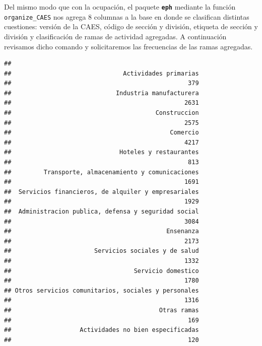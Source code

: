 \documentclass[
]{book}
\newenvironment{Shaded}{\begin{snugshade}}{\end{snugshade}}
\newcommand{\AttributeTok}[1]{\textcolor[rgb]{0.77,0.63,0.00}{#1}}
\newcommand{\CommentTok}[1]{\textcolor[rgb]{0.56,0.35,0.01}{\textit{#1}}}
\newcommand{\FunctionTok}[1]{\textcolor[rgb]{0.00,0.00,0.00}{#1}}
\newcommand{\NormalTok}[1]{#1}
\newcommand{\OtherTok}[1]{\textcolor[rgb]{0.56,0.35,0.01}{#1}}
\newcommand{\SpecialCharTok}[1]{\textcolor[rgb]{0.00,0.00,0.00}{#1}}
\begin{document}
Del mismo modo que con la ocupación, el paquete \textbf{\texttt{eph}} mediante la función \texttt{organize\_CAES} nos agrega 8 columnas a la base en donde se clasifican distintas cuestiones: versión de la CAES, código de sección y división, etiqueta de sección y división y clasificación de ramas de actividad agregadas. A continuación revisamos dicho comando y solicitaremos las frecuencias de las ramas agregadas.

\begin{Shaded}
\end{Shaded}

\begin{verbatim}
## 
##                               Actividades primarias 
##                                                 379 
##                             Industria manufacturera 
##                                                2631 
##                                        Construccion 
##                                                2575 
##                                            Comercio 
##                                                4217 
##                              Hoteles y restaurantes 
##                                                 813 
##         Transporte, almacenamiento y comunicaciones 
##                                                1691 
##  Servicios financieros, de alquiler y empresariales 
##                                                1929 
##  Administracion publica, defensa y seguridad social 
##                                                3084 
##                                           Ensenanza 
##                                                2173 
##                       Servicios sociales y de salud 
##                                                1332 
##                                  Servicio domestico 
##                                                1780 
## Otros servicios comunitarios, sociales y personales 
##                                                1316 
##                                         Otras ramas 
##                                                 169 
##                   Actividades no bien especificadas 
##                                                 120
\end{verbatim}
\end{document}
